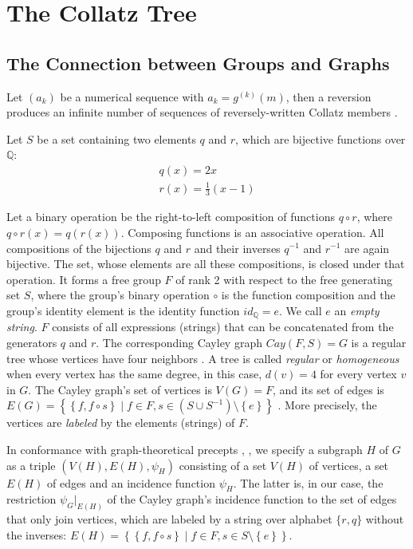 \chapter{The Collatz Tree}

\section{The Connection between Groups and Graphs}
\label{sec:groups_graphs}
Let $(a_k)$ be a numerical sequence with $a_k=g^{(k)}(m)$, then a reversion produces an infinite number of sequences of reversely-written Collatz members \cite{Ref_Klisse_2010}.

Let $S$ be a set containing two elements $q$ and $r$, which are bijective functions over $\mathbb{Q}$:
\begin{equation}
\begin{array}{l}
q(x)=2x \\ 
r(x)=\frac{1}{3}(x-1)
\end{array}
\end{equation}

Let a binary operation be the right-to-left composition of functions $q\circ r$, where $q\circ r(x)=q(r(x))$. Composing functions is an associative operation. All compositions of the bijections $q$ and $r$ and their inverses $q^{-1}$ and $r^{-1}$ are again bijective. The set, whose elements are all these compositions, is closed under that operation. It forms a free group $F$ of rank 2 with respect to the free generating set $S$, where the group's binary operation $\circ$ is the function composition and the group's identity element is the identity function $id_{\mathbb{Q}}=e$. We call $e$ an \textit{empty string}. $F$ consists of all expressions (strings) that can be concatenated from the generators $q$ and $r$. The corresponding Cayley graph $Cay(F,S)=G$ is a regular tree whose vertices have four neighbors \cite[p.~66]{Ref_Loeh}. A tree is called \textit{regular} or \textit{homogeneous} when every vertex has the same degree, in this case, $d(v)=4$ for every vertex $v$ in $G$. The Cayley graph's set of vertices is $V(G)=F$, and its set of edges is $E(G)=\left\{\left\{f,f\circ s\right\}\mid f\in F,s\in\left(S\cup S^{-1}\right)\setminus\left\{e\right\}\right\}$ \cite[p.~57]{Ref_Loeh}. More precisely, the vertices are \textit{labeled} by the elements (strings) of $F$.

In conformance with graph-theoretical precepts \cite{Ref_Bondy_Murty},
\cite{Ref_Bonnington_Little}, \cite{Ref_Bender_Williamson}
we specify a subgraph $H$ of $G$ as a triple $\left(V(H),E(H),\psi_{H}\right)$ consisting of a set $V(H)$ of vertices, a set $E(H)$ of edges and an incidence function $\psi_{H}$. The latter is, in our case, the restriction $\psi_{G}\vert_{E(H)}$ of the Cayley graph's incidence function to the set of edges that only join vertices, which are labeled by a string over alphabet $\{r,q\}$ without the inverses: $E(H)=\left\{\left\{f,f\circ s\right\}\mid f\in F,s\in S\setminus\left\{e
\right\}\right\}$.

